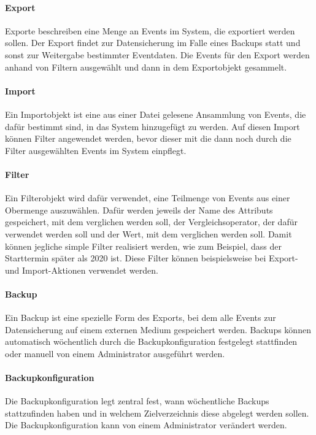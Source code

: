 \paragraph{Export}
Exporte beschreiben eine Menge an Events im System, die exportiert werden sollen. Der Export findet zur Datensicherung im Falle eines Backups statt und sonst zur Weitergabe bestimmter Eventdaten. Die Events für den Export werden anhand von Filtern ausgewählt und dann in dem Exportobjekt gesammelt.
\paragraph{Import}
Ein Importobjekt ist eine aus einer Datei gelesene Ansammlung von Events, die dafür bestimmt sind, in das System hinzugefügt zu werden. Auf diesen Import können Filter angewendet werden, bevor dieser mit  die dann noch durch die Filter ausgewählten Events im System einpflegt.
\paragraph{Filter}
Ein Filterobjekt wird dafür verwendet, eine Teilmenge von Events aus einer Obermenge auszuwählen. Dafür werden jeweils der Name des Attributs gespeichert, mit dem verglichen werden soll, der Vergleichsoperator, der dafür verwendet werden soll und der Wert, mit dem verglichen werden soll. Damit können jegliche simple Filter realisiert werden, wie zum Beispiel, dass der Starttermin später als 2020 ist. Diese Filter können beispielsweise bei Export- und Import-Aktionen verwendet werden.
\paragraph{Backup}
Ein Backup ist eine spezielle Form des Exports, bei dem alle Events zur Datensicherung auf einem externen Medium gespeichert werden. Backups können automatisch wöchentlich durch die Backupkonfiguration festgelegt stattfinden oder manuell von einem Administrator ausgeführt werden.
\paragraph{Backupkonfiguration}
Die Backupkonfiguration legt zentral fest, wann wöchentliche Backups stattzufinden haben und in welchem Zielverzeichnis diese abgelegt werden sollen. Die Backupkonfiguration kann von einem Administrator verändert werden.

